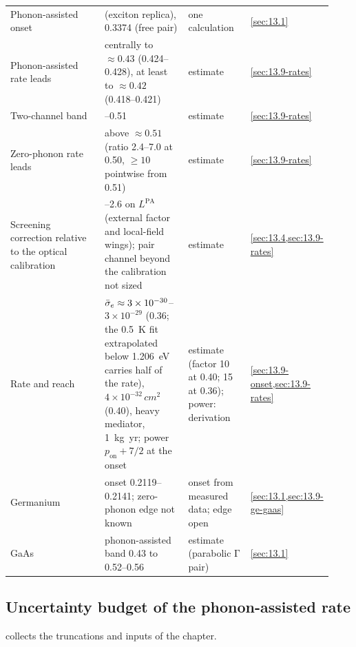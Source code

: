 \begin{table}[tbp]
\begin{tabular}{@{}>{\raggedright\arraybackslash}p{0.33\linewidth}>{\raggedright\arraybackslash}p{0.27\linewidth}>{\raggedright\arraybackslash}p{0.2\linewidth}>{\raggedright\arraybackslash}p{0.13\linewidth}@{}}
    Phonon-assisted onset & 0.3332 (exciton replica), 0.3374 (free pair) & one calculation & \cref{sec:13.1} \\
    Phonon-assisted rate leads & centrally to $\approx 0.43$ (0.424--0.428), at least to $\approx 0.42$ (0.418--0.421) & estimate & \cref{sec:13.9-rates} \\
    Two-channel band & 0.43--0.51 & estimate & \cref{sec:13.9-rates} \\
    Zero-phonon rate leads & above $\approx 0.51$ (ratio 2.4--7.0 at 0.50, $\ge 10$ pointwise from 0.51) & estimate & \cref{sec:13.9-rates} \\
    Screening correction relative to the optical calibration & 0.3--2.6 on $L^{\mathrm{PA}}$ (external factor and local-field wings); pair channel beyond the calibration not sized & estimate & \cref{sec:13.4,sec:13.9-rates} \\
    Rate and reach & $\bar{\sigma}_{e} \approx 3\times10^{-30}$--$3\times10^{-29}$ (0.36; the \SI{0.5}{K} fit extrapolated below \SI{1.206}{eV} carries half of the rate), $4\times10^{-32}\,\si{cm^2}$ (0.40), heavy mediator, \SI{1}{kg.yr}; power $p_{\mathrm{on}} + 7/2$ at the onset & estimate (factor 10 at 0.40; 15 at 0.36); power: derivation & \cref{sec:13.9-onset,sec:13.9-rates} \\
    Germanium & onset 0.2119--0.2141; zero-phonon edge not known & onset from measured data; edge open & \cref{sec:13.1,sec:13.9-ge-gaas} \\
    GaAs & phonon-assisted band 0.43 to 0.52--0.56 & estimate (parabolic $\mathrm{\Gamma}$ pair) & \cref{sec:13.1} \\
    \bottomrule
  \end{tabular}
\end{table}

\subsection{Uncertainty budget of the phonon-assisted rate}\label{sec:13.9-nuisances}

 collects the truncations and inputs of the chapter.

